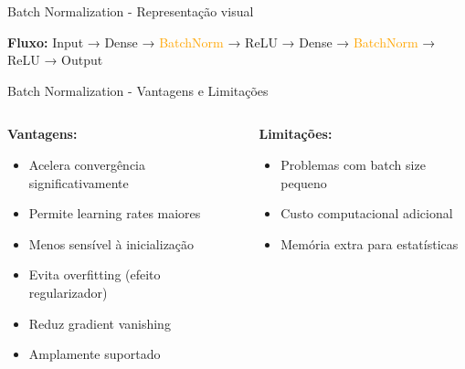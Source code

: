 \documentclass{beamer}
\begin{document}
\begin{frame}{Batch Normalization -  Representação visual}

\vspace{0.3cm}
\footnotesize
\textbf{Fluxo:} Input → Dense → \textcolor{orange}{BatchNorm} → ReLU → Dense → \textcolor{orange}{BatchNorm} → ReLU → Output
\end{frame}


\begin{frame}{Batch Normalization - Vantagens e Limitações}
\begin{columns}[T]
\begin{column}{0.48\textwidth}
\textbf{Vantagens:}
\begin{itemize}
    \item Acelera convergência significativamente
    \item Permite learning rates maiores
    \item Menos sensível à inicialização
    \item Evita overfitting (efeito regularizador)
    \item Reduz gradient vanishing
    \item Amplamente suportado
\end{itemize}
\end{column}

\begin{column}{0.48\textwidth}
\textbf{Limitações:}
\begin{itemize}
    \item Problemas com batch size pequeno
    \item Custo computacional adicional
    \item Memória extra para estatísticas
\end{itemize}
\end{column}
\end{columns}

\vspace{0.5cm}

\end{frame}
\end{document}

